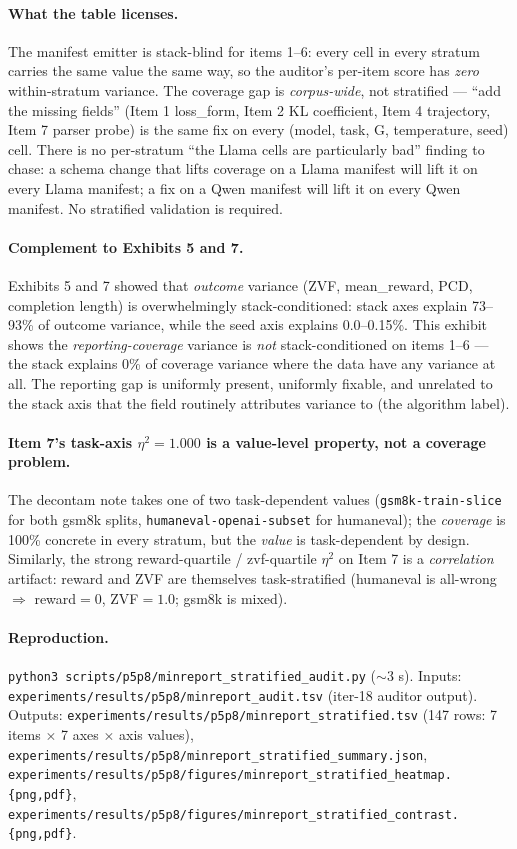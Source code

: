\paragraph{What the table licenses.}
The manifest emitter is stack-blind for items 1--6: every cell in every
stratum carries the same value the same way, so the auditor's per-item
score has \emph{zero} within-stratum variance. The coverage gap is
\emph{corpus-wide}, not stratified --- ``add the missing fields'' (Item 1
loss\_form, Item 2 KL coefficient, Item 4 trajectory, Item 7 parser
probe) is the same fix on every (model, task, G, temperature, seed)
cell. There is no per-stratum ``the Llama cells are particularly bad''
finding to chase: a schema change that lifts coverage on a Llama
manifest will lift it on every Llama manifest; a fix on a Qwen manifest
will lift it on every Qwen manifest. No stratified validation is
required.

\paragraph{Complement to Exhibits 5 and 7.}
Exhibits 5 and 7 showed that \emph{outcome} variance (ZVF, mean\_reward,
PCD, completion length) is overwhelmingly stack-conditioned:
stack axes explain 73--93\% of outcome variance, while the seed axis
explains 0.0--0.15\%. This exhibit shows the \emph{reporting-coverage}
variance is \emph{not} stack-conditioned on items 1--6 --- the stack
explains 0\% of coverage variance where the data have any variance at
all. The reporting gap is uniformly present, uniformly fixable, and
unrelated to the stack axis that the field routinely attributes
variance to (the algorithm label).

\paragraph{Item 7's task-axis $\eta^{2}=1.000$ is a value-level
property, not a coverage problem.}
The decontam note takes one of two task-dependent values
(\texttt{gsm8k-train-slice} for both gsm8k splits,
\texttt{humaneval-openai-subset} for humaneval); the \emph{coverage} is
100\% concrete in every stratum, but the \emph{value} is task-dependent
by design. Similarly, the strong reward-quartile / zvf-quartile
$\eta^{2}$ on Item 7 is a \emph{correlation} artifact: reward and ZVF
are themselves task-stratified (humaneval is all-wrong $\Rightarrow$
reward$=0$, ZVF$=1.0$; gsm8k is mixed).

\paragraph{Reproduction.}
\texttt{python3 scripts/p5p8/minreport\_stratified\_audit.py}
($\sim$3 s). Inputs:
\texttt{experiments/results/p5p8/minreport\_audit.tsv} (iter-18
auditor output). Outputs:
\texttt{experiments/results/p5p8/minreport\_stratified.tsv} (147 rows: 7
items $\times$ 7 axes $\times$ axis values),
\texttt{experiments/results/p5p8/minreport\_stratified\_summary.json},
\texttt{experiments/results/p5p8/figures/minreport\_stratified\_heatmap.\{png,pdf\}},
\texttt{experiments/results/p5p8/figures/minreport\_stratified\_contrast.\{png,pdf\}}.


